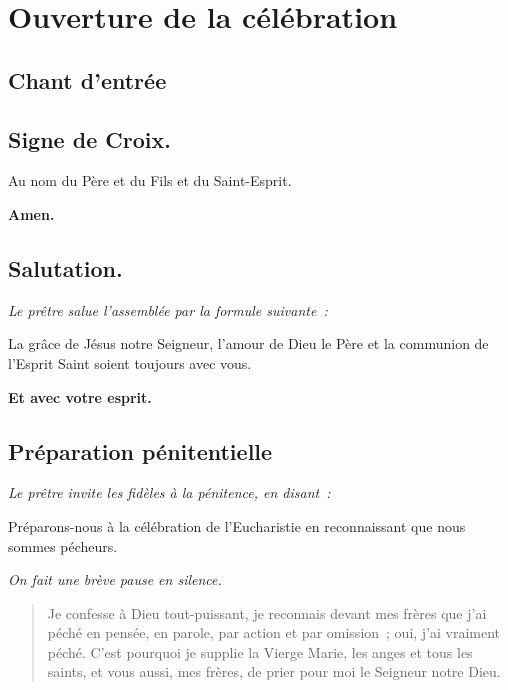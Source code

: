 \section*{Ouverture de la célébration}

\subsection*{Chant d'entrée}


\subsection*{Signe de Croix.}



Au nom du Père et du Fils et du Saint-Esprit.

{\bf Amen.}

\subsection*{Salutation.}

\emph{Le prêtre salue l'assemblée par la formule suivante~:}

La grâce de Jésus notre Seigneur,
l'amour de Dieu le Père
et la communion de l'Esprit Saint
soient toujours avec vous.

{\bf Et avec votre esprit.}


\subsection*{Préparation pénitentielle}

\emph{Le prêtre invite les fidèles à la pénitence, en disant~:}

Préparons-nous à la célébration de l'Eucharistie
en reconnaissant que nous sommes pécheurs.

\emph{On fait une brève pause en silence.}

\begin{verse}
\noindent
Je confesse à Dieu tout-puissant,\newline
je reconnais devant mes frères\newline
que j'ai péché\newline
en pensée, en parole,\newline
par action et par omission~;\newline
oui, j'ai vraiment péché.\newline
C'est pourquoi je supplie la Vierge Marie,\newline
les anges et tous les saints,\newline
et vous aussi, mes frères,\newline
de prier pour moi le Seigneur notre Dieu.\newline
\end{verse}

